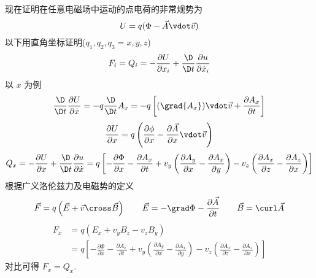 现在证明在任意电磁场中运动的点电荷的非常规势为
\begin{equation}
U = q(\Phi  - \vec A \vdot \vec v)
\end{equation}
以下用直角坐标证明(${q_1},{q_2},{q_3} = x,y,z$) %
\begin{equation}
{F_i} = {Q_i} =  - \frac{{\partial U}}{{\partial {x_i}}} + \frac{\D}{{\D t}}\frac{{\partial u}}{{\partial {{\dot x}_i}}}
\end{equation}
以 $x$ 为例
\begin{equation}
\frac{\D}{{\D t}}\frac{{\partial U}}{{\partial \dot x}} =  - q\frac{\D}{{\D t}}{A_x} =  - q\left[ {(\grad {A_x}) \vdot \vec v + \frac{{\partial {A_x}}}{{\partial t}}} \right]
\end{equation}
\begin{equation}
\frac{{\partial U}}{{\partial x}} = q\left( {\frac{{\partial \phi }}{{\partial x}} - \frac{{\partial \vec A}}{{\partial x}} \vdot \vec v} \right)
\end{equation}
\begin{equation}
{Q_x} =  - \frac{{\partial U}}{{\partial x}} + \frac{\D}{{\D t}}\frac{{\partial u}}{{\partial \dot x}} = q\left[ { - \frac{{\partial \Phi }}{{\partial x}} - \frac{{\partial {A_x}}}{{\partial t}} + {v_y}\left( {\frac{{\partial {A_y}}}{{\partial x}} - \frac{{\partial {A_x}}}{{\partial y}}} \right) - {v_z}\left( {\frac{{\partial {A_x}}}{{\partial z}} - \frac{{\partial {A_z}}}{{\partial x}}} \right)} \right]
\end{equation} 
根据广义洛伦兹力及电磁势的定义
\begin{equation}
\vec F = q\left( {\vec E + \vec v \cross \vec B} \right)
\qquad
\vec E =  - \grad \Phi  - \frac{{\partial \vec A}}{{\partial t}}
\qquad
\vec B = \curl \vec A
\end{equation}
\begin{equation}\begin{aligned}
{F_x} &= q\left( {{E_x} + {v_y}{B_z} - {v_z}{B_y}} \right) \\
&= q\left[ { - \frac{{\partial \Phi }}{{\partial x}} - \frac{{\partial {A_x}}}{{\partial t}} + {v_y}\left( {\frac{{\partial {A_y}}}{{\partial x}} - \frac{{\partial {A_x}}}{{\partial y}}} \right) - {v_z}\left( {\frac{{\partial {A_x}}}{{\partial z}} - \frac{{\partial {A_z}}}{{\partial x}}} \right)} \right]
\end{aligned}\end{equation}
对比可得 ${F_x} = {Q_x}$. 
